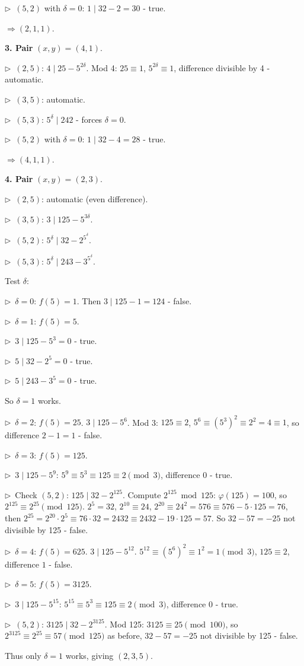 \documentclass{llmxive}
\providecommand{\compactbullet}[1]{\par\noindent$\triangleright$~#1\par}
\begin{document}
\compactbullet{\((5,2)\) with \(\delta=0\): \(1\mid32-2=30\) - true.}
\(\Rightarrow (2,1,1)\).\par
\smallskip
\textbf{3. Pair }\((x,y)=(4,1)\).\textbf{}\par
\compactbullet{\((2,5)\): \(4\mid 25-5^{2\delta}\). Mod 4: \(25\equiv1\), \(5^{2\delta}\equiv1\), difference divisible by 4 - automatic.}
\compactbullet{\((3,5)\): automatic.}
\compactbullet{\((5,3)\): \(5^{\delta}\mid 242\) - forces \(\delta=0\).}
\compactbullet{\((5,2)\) with \(\delta=0\): \(1\mid32-4=28\) - true.}
\(\Rightarrow (4,1,1)\).\par
\smallskip
\textbf{4. Pair }\((x,y)=(2,3)\).\textbf{}\par
\compactbullet{\((2,5)\): automatic (even difference).}
\compactbullet{\((3,5)\): \(3\mid125-5^{3\delta}\).}
\compactbullet{\((5,2)\): \(5^{\delta}\mid 32-2^{5^{\delta}}\).}
\compactbullet{\((5,3)\): \(5^{\delta}\mid 243-3^{5^{\delta}}\).}
Test \(\delta\):\par
\compactbullet{\(\delta=0\): \(f(5)=1\). Then \(3\mid125-1=124\) - false.}
\compactbullet{\(\delta=1\): \(f(5)=5\).}
\compactbullet{\(3\mid125-5^{3}=0\) - true.}
\compactbullet{\(5\mid32-2^{5}=0\) - true.}
\compactbullet{\(5\mid243-3^{5}=0\) - true.}
So \(\delta=1\) works.\par
\compactbullet{\(\delta=2\): \(f(5)=25\). \(3\mid125-5^{6}\). Mod 3: \(125\equiv2\), \(5^{6}\equiv(5^{3})^{2}\equiv2^{2}=4\equiv1\), so difference \(2-1=1\) - false.}
\compactbullet{\(\delta=3\): \(f(5)=125\).}
\compactbullet{\(3\mid125-5^{9}\): \(5^{9}\equiv5^{3}\equiv125\equiv2\pmod3\), difference \(0\) - true.}
\compactbullet{Check \((5,2)\): \(125\mid32-2^{125}\). Compute \(2^{125}\bmod125\): \(\varphi(125)=100\), so \(2^{125}\equiv2^{25}\pmod{125}\). \(2^{5}=32\), \(2^{10}\equiv24\), \(2^{20}\equiv24^{2}=576\equiv576-5\cdot125=76\), then \(2^{25}=2^{20}\cdot2^{5}\equiv76\cdot32=2432\equiv2432-19\cdot125=57\). So \(32-57=-25\) not divisible by 125 - false.}
\compactbullet{\(\delta=4\): \(f(5)=625\). \(3\mid125-5^{12}\). \(5^{12}\equiv(5^{6})^{2}\equiv1^{2}=1\pmod3\), \(125\equiv2\), difference \(1\) - false.}
\compactbullet{\(\delta=5\): \(f(5)=3125\).}
\compactbullet{\(3\mid125-5^{15}\): \(5^{15}\equiv5^{3}\equiv125\equiv2\pmod3\), difference \(0\) - true.}
\compactbullet{\((5,2)\): \(3125\mid32-2^{3125}\). Mod 125: \(3125\equiv25\pmod{100}\), so \(2^{3125}\equiv2^{25}\equiv57\pmod{125}\) as before, \(32-57=-25\) not divisible by 125 - false.}
Thus only \(\delta=1\) works, giving \((2,3,5)\).\par
\end{document}
